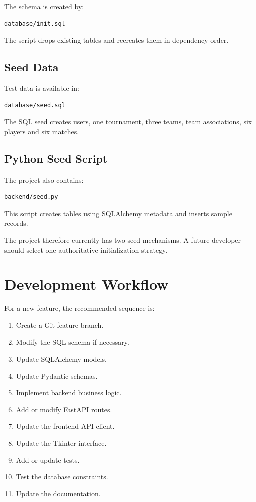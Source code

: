 \documentclass[11pt,a4paper]{article}
\begin{document}
The schema is created by:

\begin{lstlisting}
database/init.sql
\end{lstlisting}

The script drops existing tables and recreates them in dependency order.

\subsection{Seed Data}

Test data is available in:

\begin{lstlisting}
database/seed.sql
\end{lstlisting}

The SQL seed creates users, one tournament, three teams, team
associations, six players and six matches.

\subsection{Python Seed Script}

The project also contains:

\begin{lstlisting}
backend/seed.py
\end{lstlisting}

This script creates tables using SQLAlchemy metadata and inserts
sample records.

The project therefore currently has two seed mechanisms. A future
developer should select one authoritative initialization strategy.

\section{Development Workflow}

For a new feature, the recommended sequence is:

\begin{enumerate}
    \item Create a Git feature branch.
    \item Modify the SQL schema if necessary.
    \item Update SQLAlchemy models.
    \item Update Pydantic schemas.
    \item Implement backend business logic.
    \item Add or modify FastAPI routes.
    \item Update the frontend API client.
    \item Update the Tkinter interface.
    \item Add or update tests.
    \item Test the database constraints.
    \item Update the documentation.
\end{enumerate}
\end{document}
